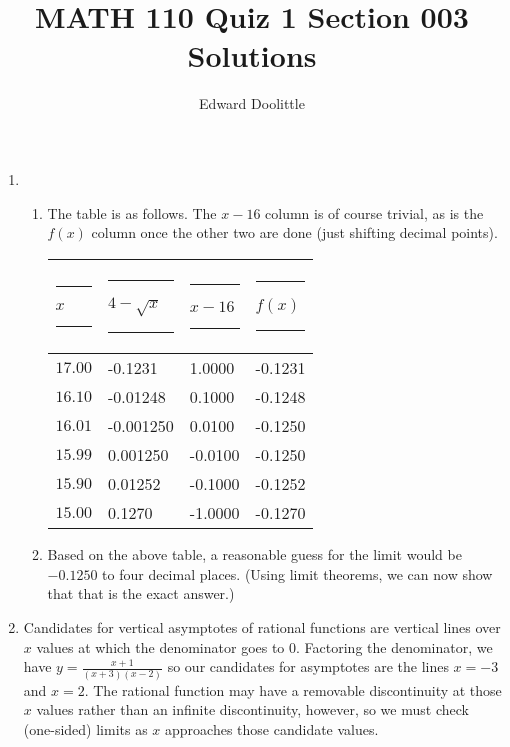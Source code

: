 \documentclass{article}
\title{MATH 110 Quiz 1 Section 003 Solutions}
\author{Edward Doolittle}
\newcommand{\ds}{\displaystyle}
\begin{document}
\maketitle
\begin{enumerate}
\item
  \begin{enumerate}
  \item The table is as follows.  The $x-16$ column is of course trivial,
    as is the $f(x)$ column once the other two are done (just shifting
    decimal points).
    \begin{center}
      \begin{tabular}{|l|l|l|l|}
        \hline
	\rule{10pt}{0pt}$x$\rule{10pt}{0pt}     
	  & \rule{10pt}{0pt}\rule{0pt}{12pt}$4-\sqrt{x}$\rule{10pt}{0pt}
	  & \rule{10pt}{0pt}$x-16$\rule{10pt}{0pt}
	  & \rule{20pt}{0pt}$f(x)$\rule{20pt}{0pt} \\
	\hline
	\rule{0pt}{12pt}$17.00$ &   -0.1231    & 1.0000 &  -0.1231   \\
	\hline
	\rule{0pt}{12pt}$16.10$ &   -0.01248   & 0.1000 &  -0.1248   \\
	\hline
	\rule{0pt}{12pt}$16.01$ &   -0.001250  & 0.0100 &  -0.1250   \\
	\hline
	\rule{0pt}{12pt}$15.99$ &    0.001250  &-0.0100 &  -0.1250   \\
	\hline
	\rule{0pt}{12pt}$15.90$ &    0.01252   &-0.1000 &  -0.1252   \\
	\hline
	\rule{0pt}{12pt}$15.00$ &    0.1270    &-1.0000 &  -0.1270   \\
	\hline
      \end{tabular}
    \end{center}
  \item %
    Based on the above table, a reasonable guess for the limit would be
    $-0.1250$ to four decimal places.  (Using limit theorems, we can now
    show that that is the exact answer.)
  \end{enumerate}
\item %
  Candidates for vertical asymptotes of rational functions 
  are vertical lines over $x$ values at which the denominator goes to $0$.
  Factoring the denominator, we have $\ds y = \frac{x+1}{(x+3)(x-2)}$ so
  our candidates for asymptotes are the lines $x=-3$ and $x=2$.  The
  rational function may have a removable discontinuity at those $x$ values
  rather than an infinite discontinuity, however, so we must check (one-sided)
  limits as $x$ approaches those candidate values.


\end{enumerate}
\end{document}
